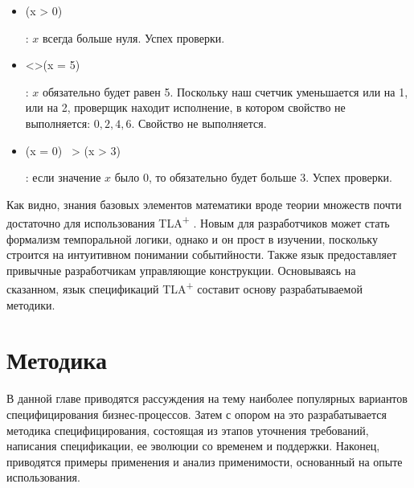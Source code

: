 \documentclass[14pt, openany]{report}
\newcommand{\tlapl}{TLA\textsuperscript{+} }
\begin{document}
\begin{itemize}
  \item 
    \begin{tla} 
      [](x > 0)
    \end{tla}
\begin{tlatex}
%
\end{tlatex}
: \(x\) всегда больше нуля. Успех проверки.
  \item
    \begin{tla}
      <>(x = 5)
    \end{tla}
\begin{tlatex}
%
\end{tlatex}
: \(x\) обязательно будет равен 5. Поскольку наш счетчик уменьшается или на 1, или на 2, проверщик находит исполнение, в котором свойство не выполняется: \(0,2,4,6\). Свойство не выполняется.
  \item
    \begin{tla}
      (x = 0) ~> (x > 3)
    \end{tla}
\begin{tlatex}
%
\end{tlatex}
: если значение \(x\) было 0, то обязательно будет больше 3. Успех проверки.
\end{itemize}

Как видно, знания базовых элементов математики вроде теории множеств почти достаточно для использования \tlapl. Новым для разработчиков может стать формализм темпоральной логики, однако и он прост в изучении, поскольку строится на интуитивном понимании событийности. Также язык предоставляет привычные разработчикам управляющие конструкции. Основываясь на сказанном, язык спецификаций \tlapl составит основу разрабатываемой методики.


\chapter{Методика}
В данной главе приводятся рассуждения на тему наиболее популярных вариантов специфицирования бизнес-процессов. Затем с опором на это разрабатывается методика специфицирования, состоящая из этапов уточнения требований, написания спецификации, ее эволюции со временем и поддержки. Наконец, приводятся примеры применения и анализ применимости, основанный на опыте использования.
\end{document}
